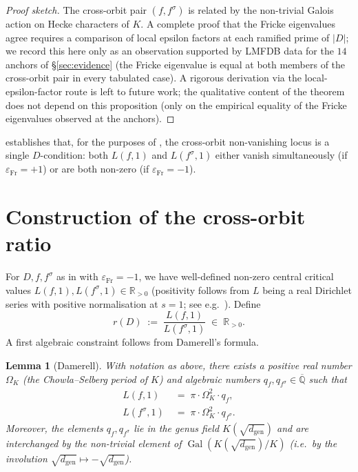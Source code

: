 \documentclass[11pt]{amsart}
\newtheorem{lemma}[theorem]{Lemma}
\theoremstyle{definition}
\theoremstyle{remark}
\DeclareMathOperator{\Gal}{Gal}
\newcommand{\Q}{\mathbb{Q}}
\newcommand{\R}{\mathbb{R}}
\begin{document}
\begin{proof}[Proof sketch]
The cross-orbit pair $(f, f^{\sigma})$ is related by the
non-trivial Galois action on Hecke characters of $K$. A complete
proof that the Fricke eigenvalues agree requires a comparison of
local epsilon factors at each ramified prime of $|D|$; we record
this here only as an observation supported by LMFDB data for the
$14$ anchors of \S\ref{sec:evidence} (the Fricke eigenvalue is
equal at both members of the cross-orbit pair in every tabulated
case). A rigorous derivation via the
local-epsilon-factor route is left to future work; the qualitative
content of the theorem does not depend on this proposition (only on
the empirical equality of the Fricke eigenvalues observed at the
anchors).
\end{proof}

 establishes that, for the purposes of
, the cross-orbit non-vanishing locus is a
single \(D\)-condition: both \(L(f, 1)\) and \(L(f^{\sigma}, 1)\)
either vanish simultaneously (if \(\varepsilon_{\mathrm{Fr}} = +1\))
or are both non-zero (if \(\varepsilon_{\mathrm{Fr}} = -1\)).


\section{Construction of the cross-orbit ratio}\label{sec:construction}

For \(D, f, f^{\sigma}\) as in  with
\(\varepsilon_{\mathrm{Fr}} = -1\), we have well-defined non-zero
central critical values \(L(f, 1), L(f^{\sigma}, 1) \in \R_{>0}\)
(positivity follows from \(L\) being a real Dirichlet series with
positive normalisation at \(s = 1\); see e.g.\
\cite[Cor.~5.13]{Iwaniec2004}). Define
\[
   r(D) \;:=\; \frac{L(f, 1)}{L(f^{\sigma}, 1)} \;\in\; \R_{>0} .
\]
A first algebraic constraint follows from Damerell's formula.

\begin{lemma}[Damerell]\label{lem:damerell}
With notation as above, there exists a positive real number
\(\Omega_{K}\) (the Chowla--Selberg period of \(K\)) and algebraic
numbers \(q_{f}, q_{f^{\sigma}} \in \overline{\Q}\) such that
\begin{align*}
  L(f, 1) &\;=\; \pi \cdot \Omega_{K}^{2} \cdot q_{f}, \\
  L(f^{\sigma}, 1) &\;=\; \pi \cdot \Omega_{K}^{2} \cdot q_{f^{\sigma}}.
\end{align*}
Moreover, the elements \(q_{f}, q_{f^{\sigma}}\) lie in the genus
field \(K(\sqrt{d_{\mathrm{gen}}})\) and are interchanged by the
non-trivial element of \(\Gal(K(\sqrt{d_{\mathrm{gen}}})/K)\) (i.e.\
by the involution \(\sqrt{d_{\mathrm{gen}}} \mapsto
-\sqrt{d_{\mathrm{gen}}}\)).
\end{lemma}
\end{document}
